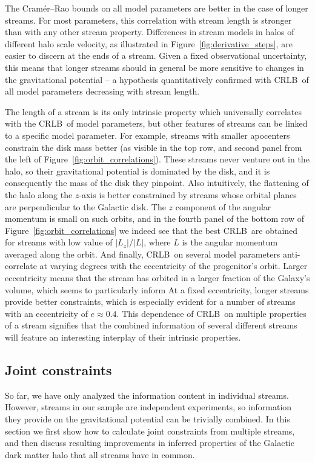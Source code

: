 \documentclass[modern]{aastex61}
\newcommand{\acronym}[1]{{\small{#1}}}
\newcommand{\CRLB}{\acronym{CRLB}}
\begin{document}
The Cram\' er--Rao bounds on all model parameters are better in the case of longer streams.
For most parameters, this correlation with stream length is stronger than with any other stream property.
Differences in stream models in halos of different halo scale velocity, as illustrated in Figure~\ref{fig:derivative_steps}, are easier to discern at the ends of a stream.
Given a fixed observational uncertainty, this means that longer streams should in general be more sensitive to changes in the gravitational potential -- a hypothesis quantitatively confirmed with \CRLB\ of all model parameters decreasing with stream length.

The length of a stream is its only intrinsic property which universally correlates with the \CRLB\ of model parameters, but other features of streams can be linked to a specific model parameter.
For example, streams with smaller apocenters constrain the disk mass better (as visible in the top row, and second panel from the left of Figure~\ref{fig:orbit_correlations}).
These streams never venture out in the halo, so their gravitational potential is dominated by the disk, and it is consequently the mass of the disk they pinpoint.
Also intuitively, the flattening of the halo along the $z$-axis is better constrained by streams whose orbital planes are perpendicular to the Galactic disk.
The $z$ component of the angular momentum is small on such orbits, and in the fourth panel of the bottom row of Figure~\ref{fig:orbit_correlations} we indeed see that the best \CRLB\ are obtained for streams with low value of $|L_z|/|L|$, where $L$ is the angular momentum averaged along the orbit.
And finally, \CRLB\ on several model parameters anti-correlate at varying degrees with the eccentricity of the progenitor's orbit.
Larger eccentricity means that the stream has orbited in a larger fraction of the Galaxy's volume, which seems to particularly inform 
At a fixed eccentricity, longer streams provide better constraints, which is especially evident for a number of streams with an eccentricity of $e\approx0.4$.
This dependence of \CRLB\ on multiple properties of a stream signifies that the combined information of several different streams will feature an interesting interplay of their intrinsic properties.

\subsection{Joint constraints}
\label{sec:res_joint}
So far, we have only analyzed the information content in individual streams.
However, streams in our sample are independent experiments, so information they provide on the gravitational potential can be trivially combined.
In this section we first show how to calculate joint constraints from multiple streams, and then discuss resulting improvements in inferred properties of the Galactic dark matter halo that all streams have in common. 
\end{document}
